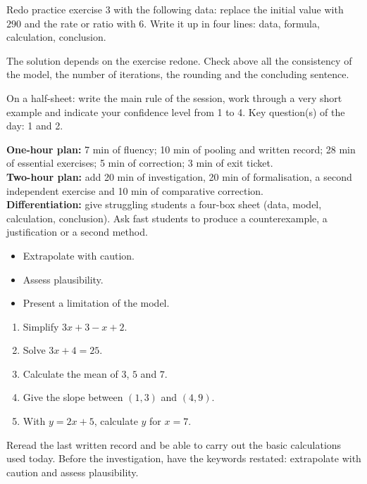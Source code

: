 
\begin{homework}Redo practice exercise 3 with the following data: replace the initial value with $290$ and the rate or ratio with $6$. Write it up in four lines: data, formula, calculation, conclusion.\end{homework}
\begin{solution}The solution depends on the exercise redone. Check above all the consistency of the model, the number of iterations, the rounding and the concluding sentence.\end{solution}

\begin{exitticket}[3 minutes]On a half-sheet: write the main rule of the session, work through a very short example and indicate your confidence level from 1 to 4. Key question(s) of the day: 1 and 2.\end{exitticket}

\ifmxteacher
\begin{method}
\textbf{One-hour plan:} 7 min of fluency; 10 min of pooling and written record; 28 min of essential exercises; 5 min of correction; 3 min of exit ticket.\\
\textbf{Two-hour plan:} add 20 min of investigation, 20 min of formalisation, a second independent exercise and 10 min of comparative correction.\\
\textbf{Differentiation:} give struggling students a four-box sheet (data, model, calculation, conclusion). Ask fast students to produce a counterexample, a justification or a second method.
\end{method}
\fi
{}
\begin{objectives}\begin{itemize}\item Extrapolate with caution.\item Assess plausibility.\item Present a limitation of the model.\end{itemize}\end{objectives}
\begin{fluency}\begin{enumerate}\item Simplify $3x+3-x+2$. \item Solve $3x+4=25$. \item Calculate the mean of $3$, $5$ and $7$. \item Give the slope between $(1,3)$ and $(4,9)$. \item With $y=2x+5$, calculate $y$ for $x=7$. \end{enumerate}\end{fluency}
\begin{prerequisites}Reread the last written record and be able to carry out the basic calculations used today. Before the investigation, have the keywords restated: extrapolate with caution and assess plausibility.\end{prerequisites}

